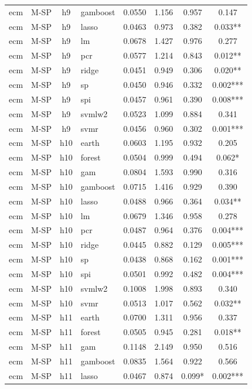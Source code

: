 \begin{ThreePartTable}
\begin{longtable}[t]{llclcccc}
ecm & M-SP & h9 & gamboost & 0.0550 & 1.156 & 0.957 & 0.147\\
ecm & M-SP & h9 & lasso & 0.0463 & 0.973 & 0.382 & 0.033**\\
ecm & M-SP & h9 & lm & 0.0678 & 1.427 & 0.976 & 0.277\\
ecm & M-SP & h9 & pcr & 0.0577 & 1.214 & 0.843 & 0.012**\\
ecm & M-SP & h9 & ridge & 0.0451 & 0.949 & 0.306 & 0.020**\\
ecm & M-SP & h9 & sp & 0.0450 & 0.946 & 0.332 & 0.002***\\
ecm & M-SP & h9 & spi & 0.0457 & 0.961 & 0.390 & 0.008***\\
ecm & M-SP & h9 & svmlw2 & 0.0523 & 1.099 & 0.884 & 0.341\\
ecm & M-SP & h9 & svmr & 0.0456 & 0.960 & 0.302 & 0.001***\\
\addlinespace
ecm & M-SP & h10 & earth & 0.0603 & 1.195 & 0.932 & 0.205\\
ecm & M-SP & h10 & forest & 0.0504 & 0.999 & 0.494 & 0.062*\\
ecm & M-SP & h10 & gam & 0.0804 & 1.593 & 0.990 & 0.316\\
ecm & M-SP & h10 & gamboost & 0.0715 & 1.416 & 0.929 & 0.390\\
ecm & M-SP & h10 & lasso & 0.0488 & 0.966 & 0.364 & 0.034**\\
ecm & M-SP & h10 & lm & 0.0679 & 1.346 & 0.958 & 0.278\\
ecm & M-SP & h10 & pcr & 0.0487 & 0.964 & 0.376 & 0.004***\\
ecm & M-SP & h10 & ridge & 0.0445 & 0.882 & 0.129 & 0.005***\\
ecm & M-SP & h10 & sp & 0.0438 & 0.868 & 0.162 & 0.001***\\
ecm & M-SP & h10 & spi & 0.0501 & 0.992 & 0.482 & 0.004***\\
ecm & M-SP & h10 & svmlw2 & 0.1008 & 1.998 & 0.893 & 0.340\\
ecm & M-SP & h10 & svmr & 0.0513 & 1.017 & 0.562 & 0.032**\\
\addlinespace
ecm & M-SP & h11 & earth & 0.0700 & 1.311 & 0.956 & 0.337\\
ecm & M-SP & h11 & forest & 0.0505 & 0.945 & 0.281 & 0.018**\\
ecm & M-SP & h11 & gam & 0.1148 & 2.149 & 0.950 & 0.516\\
ecm & M-SP & h11 & gamboost & 0.0835 & 1.564 & 0.922 & 0.566\\
ecm & M-SP & h11 & lasso & 0.0467 & 0.874 & 0.099* & 0.002***\\

\end{longtable}
\end{ThreePartTable}
